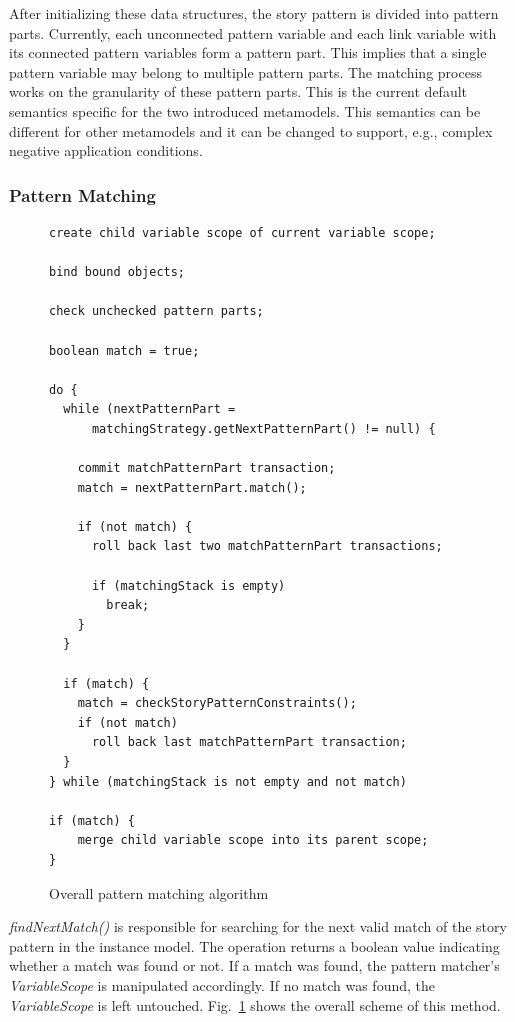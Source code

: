 After initializing these data structures, the story pattern is divided into pattern parts.
Currently, each unconnected pattern variable and each link variable with its connected pattern variables form a pattern part.
This implies that a single pattern variable may belong to multiple pattern parts.
The matching process works on the granularity of these pattern parts.
This is the current default semantics specific for the two introduced metamodels.
This semantics can be different for other metamodels and it can be changed to support, e.g., complex negative application conditions.


\subsubsection{Pattern Matching}
\label{sec:spm_pattern_matching}

\begin{figure}
\begin{verbatim}
create child variable scope of current variable scope;

bind bound objects;

check unchecked pattern parts;

boolean match = true;

do {
  while (nextPatternPart = 
      matchingStrategy.getNextPatternPart() != null) {
    
    commit matchPatternPart transaction;
    match = nextPatternPart.match();
    
    if (not match) {
      roll back last two matchPatternPart transactions;
      
      if (matchingStack is empty)
        break;
    }
  }
    
  if (match) {
    match = checkStoryPatternConstraints();
    if (not match)
      roll back last matchPatternPart transaction;
  }
} while (matchingStack is not empty and not match)

if (match) {
	merge child variable scope into its parent scope;
}
\end{verbatim}
\caption{Overall pattern matching algorithm}
\label{listing:pattern_matcher_execution}
\end{figure}

\emph{findNextMatch()} is responsible for searching for the next valid match of the story pattern in the instance model.
The operation returns a boolean value indicating whether a match was found or not.
If a match was found, the pattern matcher's \emph{VariableScope} is manipulated accordingly.
If no match was found, the \emph{VariableScope} is left untouched.
Fig.~\ref{listing:pattern_matcher_execution} shows the overall scheme of this method.

